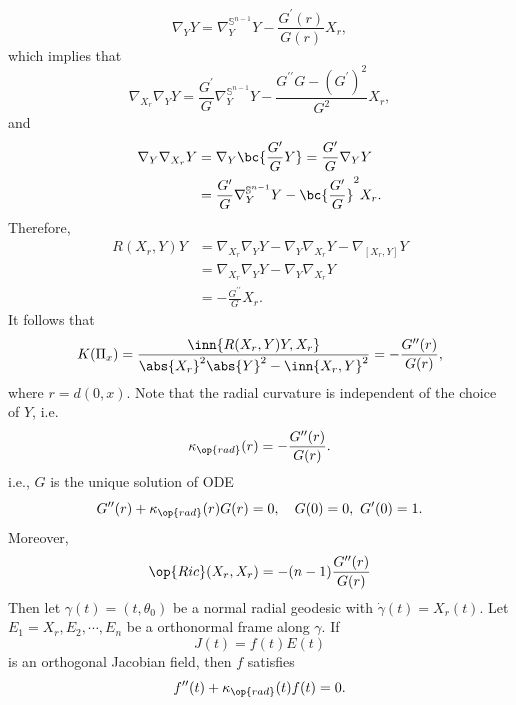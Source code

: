 \begin{equation*}
    \nabla_{Y}Y = \nabla^{\mathbb{S}^{n-1}}_{Y}Y - \frac{G^\prime(r)}{G(r)}X_r,
\end{equation*}
which implies that
\begin{equation*}
    \nabla_{X_r}\nabla_{Y}Y = \frac{G^\prime}{G}\nabla^{\mathbb{S}^{n-1}}_{Y}Y - \frac{G^{\prime\prime}G - (G^\prime)^2}{G^2}X_r,
\end{equation*}
and
\begin{align*}
    \nabla_{Y}\nabla_{X_r}Y &= \nabla_{Y}\bc{\frac{G^\prime}{G}Y} = \frac{G^\prime}{G}\nabla_{Y}Y \\
    &= \frac{G^\prime}{G}\nabla^{\mathbb{S}^{n-1}}_{Y}Y  - \bc{\frac{G^\prime}{G}}^2X_r.
\end{align*}
Therefore,
\begin{align*}
    R(X_r,Y)Y &= \nabla_{X_r}\nabla_{Y}Y - \nabla_{Y}\nabla_{X_r}Y - \nabla_{[X_r,Y]}Y \\
    &= \nabla_{X_r}\nabla_{Y}Y - \nabla_{Y}\nabla_{X_r}Y \\
    &= -\frac{G^{\prime\prime}}{G}X_r.
\end{align*}
It follows that
\begin{equation*}
    K(\Pi_x) = \frac{\inn{R(X_r,Y)Y,X_r}}{\abs{X_r}^2\abs{Y}^2 - \inn{X_r,Y}^2} = -\frac{G^{\prime\prime}(r)}{G(r)},
\end{equation*}
where $r = d(0,x)$. Note that the radial curvature is independent of the choice of $Y$, i.e.
\begin{equation*}
    \kappa_{\op{rad}}(r) = -\frac{G^{\prime\prime}(r)}{G(r)}.
\end{equation*}
i.e., $G$ is the unique solution of ODE
\begin{equation*}
    G^{\prime\prime}(r) + \kappa_{\op{rad}}(r)G(r) = 0,\quad G(0) = 0,~G^\prime(0) = 1.
\end{equation*}
Moreover,
\begin{equation*}
    \op{Ric}(X_r,X_r) = -(n-1)\frac{G^{\prime\prime}(r)}{G(r)}
\end{equation*}
Then let $\gamma(t) = (t,\theta_0)$ be a normal radial geodesic with $\dot{\gamma}(t) = X_r(t)$. Let $E_1 = X_r,E_2,\cdots,E_n$ be a orthonormal frame along $\gamma$. If
\begin{equation*}
    J(t) = f(t)E(t)
\end{equation*}
is an orthogonal Jacobian field, then $f$ satisfies
\begin{equation*}
    f^{\prime\prime}(t) + \kappa_{\op{rad}}(t) f(t) = 0.
\end{equation*}

